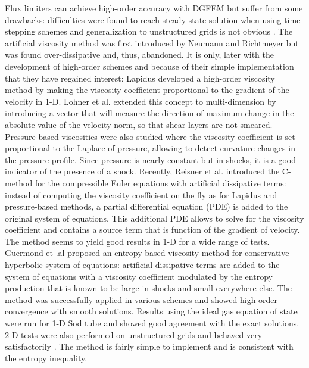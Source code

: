 Flux limiters \cite{FluxLimiter1, FluxLimiter3} can achieve high-order accuracy with DGFEM \cite{FluxLimiter2} but suffer from some drawbacks: difficulties were found to reach steady-state solution when using time-stepping schemes and generalization to unstructured grids is not obvious \cite{FluxLimiter4}. The artificial viscosity method was first introduced by Neumann and Richtmeyer \cite{Neumann} but was found over-dissipative and, thus, abandoned. It is only, later with the development of high-order schemes and because of their simple implementation that they have regained interest: Lapidus \cite{Lapidus_paper, Lapidus_book} developed a high-order viscosity method by making the viscosity coefficient proportional to the gradient of the velocity in 1-D. Lohner et al. \cite{LMP} extended this concept to multi-dimension by introducing a vector that will measure the direction of maximum change in the absolute value of the velocity norm, so that shear layers are not smeared. Pressure-based viscosities were also studied \cite{PBV_book} where the viscosity coefficient is set proportional to the Laplace of pressure, allowing to detect curvature changes in the pressure profile. Since pressure is nearly constant but in shocks, it is a good indicator of the presence of a shock.
Recently, Reisner et al. \cite{Reisner} introduced the C-method for the compressible Euler equations with artificial dissipative terms: instead of computing the viscosity coefficient on the fly as for Lapidus and pressure-based methods, a partial differential equation (PDE) is added to the original system of equations. This additional PDE allows to solve for the viscosity coefficient and contains a source term that is function of the gradient of velocity. The method seems to yield good results in 1-D for a wide range of tests. 
Guermond et .al \cite{jlg1, jlg2, jlg3} proposed an entropy-based viscosity method for conservative hyperbolic system of equations: artificial dissipative terms are added to the system of equations with a viscosity coefficient modulated by the entropy production that is known to be large in shocks and small everywhere else. The method was successfully applied in various schemes \cite{jlg2, jlg3, valentin} and showed high-order convergence with smooth solutions. Results using the ideal gas equation of state were run for 1-D Sod tube and showed good agreement with the exact solutions. 2-D tests were also performed on unstructured grids and behaved very satisfactorily \cite{valentin}. The method is fairly simple to implement and is consistent with the entropy inequality.\\
